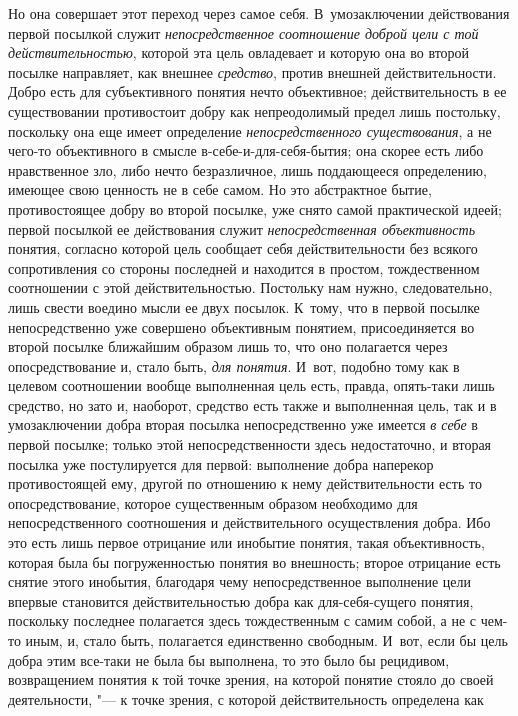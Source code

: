 Но она совершает этот переход через самое себя.
В~умозаключении действования первой посылкой служит
{\em непосредственное соотношение доброй
цели с той действительностью}, которой эта цель овладевает и
которую она во второй посылке направляет, как внешнее {\em средство}, против
внешней действительности. Добро есть для субъективного понятия нечто
объективное; действительность в ее существовании противостоит добру как
непреодолимый предел лишь постольку, поскольку она еще имеет определение
{\em непосредственного существования},
а не чего-то объективного в смысле в-себе-и-для-себя-бытия;
она скорее есть либо нравственное зло, либо нечто безразличное, лишь
поддающееся определению, имеющее свою ценность не в себе самом. Но это
абстрактное бытие, противостоящее добру во второй посылке,
уже снято самой практической идеей; первой посылкой ее действования служит
{\em непосредственная объективность}
понятия, согласно которой цель сообщает себя действительности
без всякого сопротивления со стороны последней и находится в простом,
тождественном соотношении с этой действительностью. Постольку нам нужно,
следовательно, лишь свести воедино мысли ее двух посылок. К~тому, что в
первой посылке непосредственно уже совершено объективным понятием,
присоединяется во второй посылке ближайшим образом лишь то, что оно
полагается через опосредствование и, стало быть,
{\em для понятия}. И~вот,
подобно тому как в целевом соотношении вообще выполненная цель есть,
правда, опять-таки лишь средство, но зато и, наоборот, средство есть также
и выполненная цель, так и в умозаключении добра вторая посылка
непосредственно уже имеется {\em в
себе} в первой посылке; только этой непосредственности здесь
недостаточно, и вторая посылка уже постулируется для первой: выполнение
добра наперекор противостоящей ему, другой по отношению к нему
действительности есть то опосредствование, которое существенным образом
необходимо для непосредственного соотношения и действительного
осуществления добра. Ибо это есть лишь первое отрицание или инобытие
понятия, такая объективность, которая была бы погруженностью понятия во
внешность; второе отрицание есть снятие этого инобытия, благодаря чему
непосредственное выполнение цели впервые становится действительностью добра
как для-себя-сущего понятия, поскольку последнее полагается здесь
тождественным с самим собой, а не с чем-то иным, и, стало быть,
полагается единственно свободным. И~вот, если бы цель добра этим все-таки
не была бы выполнена, то это было бы рецидивом, возвращением понятия к той
точке зрения, на которой понятие стояло до своей деятельности, "---
к точке зрения, с которой действительность определена как
